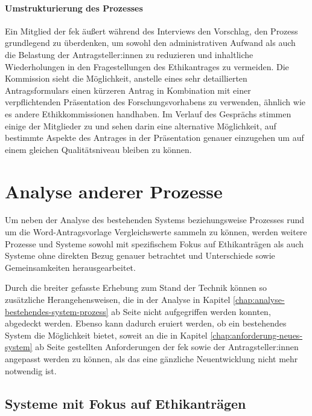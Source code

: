 \documentclass[a4paper,12pt,twoside]{scrreprt}
\begin{document}
\subsubsection*{Umstrukturierung des Prozesses}
\label{sub-sub-sec:umstrukturierung-prozess}

Ein Mitglied der \ac{fek} äußert während des Interviews den Vorschlag, den Prozess grundlegend zu überdenken, um sowohl den administrativen Aufwand als auch die Belastung der Antragsteller:innen zu reduzieren und inhaltliche Wiederholungen in den Fragestellungen des Ethikantrages zu vermeiden. Die Kommission sieht die Möglichkeit, anstelle eines sehr detaillierten Antragsformulars einen kürzeren Antrag in Kombination mit einer verpflichtenden Präsentation des Forschungsvorhabens zu verwenden, ähnlich wie es andere Ethikkommissionen handhaben. Im Verlauf des Gesprächs stimmen einige der Mitglieder zu und sehen darin eine alternative Möglichkeit, auf bestimmte Aspekte des Antrages in der Präsentation genauer einzugehen um auf einem gleichen Qualitätsniveau bleiben zu können.

\cleardoublepage
\chapter{Analyse anderer Prozesse}
\label{chap:analyse-anderer-prozesse}

Um neben der Analyse des bestehenden Systems beziehungsweise Prozesses rund um die Word-Antragsvorlage Vergleichswerte sammeln zu können, werden weitere Prozesse und Systeme sowohl mit spezifischem Fokus auf Ethikanträgen als auch Systeme ohne direkten Bezug genauer betrachtet und Unterschiede sowie Gemeinsamkeiten herausgearbeitet.

Durch die breiter gefasste Erhebung zum Stand der Technik können so zusätzliche Herangehensweisen, die in der Analyse in Kapitel \ref{chap:analyse-bestehendes-system-prozess} ab Seite \pageref{chap:analyse-bestehendes-system-prozess} nicht aufgegriffen werden konnten, abgedeckt werden. Ebenso kann dadurch eruiert werden, ob ein bestehendes System die Möglichkeit bietet, soweit an die in Kapitel \ref{chap:anforderung-neues-system} ab Seite \pageref{chap:anforderung-neues-system} gestellten Anforderungen der \acl{fek} sowie der Antragsteller:innen angepasst werden zu können, als das eine gänzliche Neuentwicklung nicht mehr notwendig ist.

\section{Systeme mit Fokus auf Ethikanträgen}
\label{sec:systeme-mit-fokkus-ethikantrage}
\end{document}

